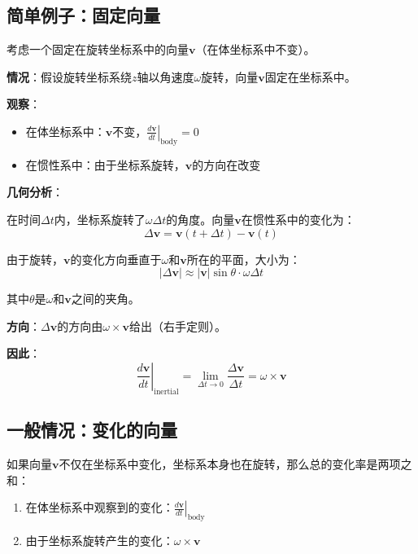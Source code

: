 \documentclass[12pt,a4paper]{article}
\begin{document}
\subsection{简单例子：固定向量}

考虑一个固定在旋转坐标系中的向量$\bm{v}$（在体坐标系中不变）。

\textbf{情况}：假设旋转坐标系绕$z$轴以角速度$\omega$旋转，向量$\bm{v}$固定在坐标系中。

\textbf{观察}：
\begin{itemize}
\item 在体坐标系中：$\bm{v}$不变，$\left.\frac{d\bm{v}}{dt}\right|_{\text{body}} = 0$
\item 在惯性系中：由于坐标系旋转，$\bm{v}$的方向在改变
\end{itemize}

\textbf{几何分析}：

在时间$\Delta t$内，坐标系旋转了$\omega \Delta t$的角度。向量$\bm{v}$在惯性系中的变化为：
\begin{equation}
\Delta \bm{v} = \bm{v}(t + \Delta t) - \bm{v}(t)
\end{equation}

由于旋转，$\bm{v}$的变化方向垂直于$\omega$和$\bm{v}$所在的平面，大小为：
\begin{equation}
|\Delta \bm{v}| \approx |\bm{v}| \sin\theta \cdot \omega \Delta t
\end{equation}

其中$\theta$是$\omega$和$\bm{v}$之间的夹角。

\textbf{方向}：$\Delta \bm{v}$的方向由$\omega \times \bm{v}$给出（右手定则）。

\textbf{因此}：
\begin{equation}
\left.\frac{d\bm{v}}{dt}\right|_{\text{inertial}} = \lim_{\Delta t \to 0} \frac{\Delta \bm{v}}{\Delta t} = \omega \times \bm{v}
\end{equation}

\subsection{一般情况：变化的向量}

如果向量$\bm{v}$不仅在坐标系中变化，坐标系本身也在旋转，那么总的变化率是两项之和：
\begin{enumerate}
\item 在体坐标系中观察到的变化：$\left.\frac{d\bm{v}}{dt}\right|_{\text{body}}$
\item 由于坐标系旋转产生的变化：$\omega \times \bm{v}$
\end{enumerate}
\end{document}
